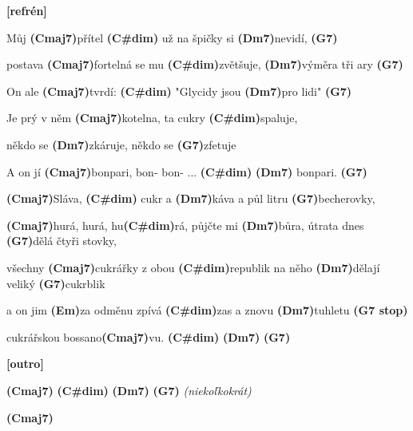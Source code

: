 \documentclass{article}
\newenvironment{song}{%
	\pagebreak%
	\parindent0pt%
    \Large%
}{%
}%
\newcommand{\ch}[1]{\textbf{(#1)}}
\newcommand{\note}[1]{\textbf{[#1]}}
\begin{document}
\begin{song}
\bigskip
\note{refrén}
\bigskip

Můj \ch{Cmaj7}přítel \ch{C\#dim} už na špičky si \ch{Dm7}nevidí, \ch{G7} \par
postava \ch{Cmaj7}fortelná se mu \ch{C\#dim}zvětšuje, \ch{Dm7}výměra tři ary \ch{G7} \par
On ale \ch{Cmaj7}tvrdí: \ch{C\#dim} "Glycidy jsou \ch{Dm7}pro lidi" \ch{G7} \par
Je prý v něm \ch{Cmaj7}kotelna, ta cukry \ch{C\#dim}spaluje, \par
někdo se \ch{Dm7}zkáruje, někdo se \ch{G7}zfetuje \par
A on jí \ch{Cmaj7}bonpari, bon- bon- ... \ch{C\#dim} \ch{Dm7} bonpari. \ch{G7} \par

\bigskip

\ch{Cmaj7}Sláva, \ch{C\#dim} cukr a \ch{Dm7}káva a půl litru \ch{G7}becherovky, \par
\ch{Cmaj7}hurá, hurá, hu\ch{C\#dim}rá, půjčte mi \ch{Dm7}bůra, útrata dnes \ch{G7}dělá čtyři stovky, \par
všechny \ch{Cmaj7}cukrářky z obou \ch{C\#dim}republik na něho \ch{Dm7}dělají veliký \ch{G7}cukrblik \par
a on jim \ch{Em}za odměnu zpívá \ch{C\#dim}zas a znovu \ch{Dm7}tuhletu \ch{G7 stop} \par
cukrářskou bossano\ch{Cmaj7}vu. \ch{C\#dim} \ch{Dm7} \ch{G7} \par

\bigskip

\note{outro} \par
\ch{Cmaj7} \ch{C\#dim} \ch{Dm7} \ch{G7} \textit{(niekoľkokrát)} \par
\ch{Cmaj7} \par

\end{song}
\end{document}
